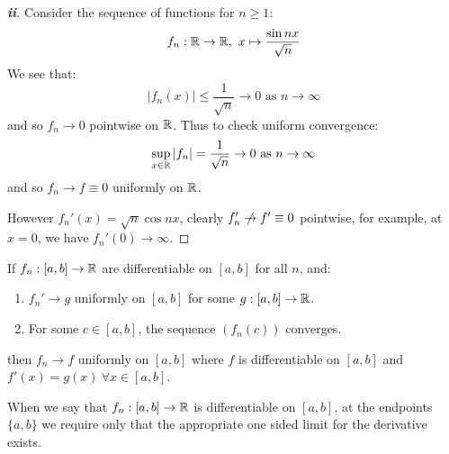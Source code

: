 \documentclass[../main.tex]{subfiles}
\begin{document}
\begin{proof}[\textbf{ii}]
  Consider the sequence of functions for $n \geq 1$:
  \[
    f_n: \mathbb{R} \to \mathbb{R},\ x \mapsto \frac{\sin nx}{\sqrt{n}}
  \]
  We see that:
  \[
    |f_n(x)| \leq \frac{1}{\sqrt{n}} \to 0 \text{ as } n \to \infty
  \]
  and so $f_n \to 0$ pointwise on $\mathbb{R}$.
  Thus to check uniform convergence:
  \[
    \sup_{x \in \mathbb{R}} |f_n| = \frac{1}{\sqrt{n}} \to 0 \text{ as } n \to \infty
  \]
  and so $f_n \to f \equiv 0$ uniformly on $\mathbb{R}$.

  However $f_n'(x) = \sqrt{n}\cos nx$, clearly $f_n' \centernot\to f' \equiv 0$ pointwise, for example, at $x = 0$, we have $f_n'(0) \to \infty$.
\end{proof}
\begin{theorem}
  If $f_n: [a, b] \to \mathbb{R}$ are differentiable on $[a, b]$ for all $n$, and: \label{unifDiff}
  \begin{enumerate}
    \item $f_n' \to g$ uniformly on $[a, b]$ for some $g: [a, b] \to \mathbb{R}$.
    \item For some $c \in [a, b]$, the sequence $(f_n(c))$ converges.
  \end{enumerate}
  then $f_n \to f$ uniformly on $[a, b]$ where $f$ is differentiable on $[a, b]$ and $f'(x) = g(x)\ \forall x \in [a, b]$.
\end{theorem}
\begin{remark}[Note]
  When we say that $f_n: [a, b] \to \mathbb{R}$ is differentiable on $[a, b]$, at the endpoints $\{a, b\}$ we require only that the appropriate one sided limit for the derivative exists.
\end{remark}
\end{document}
